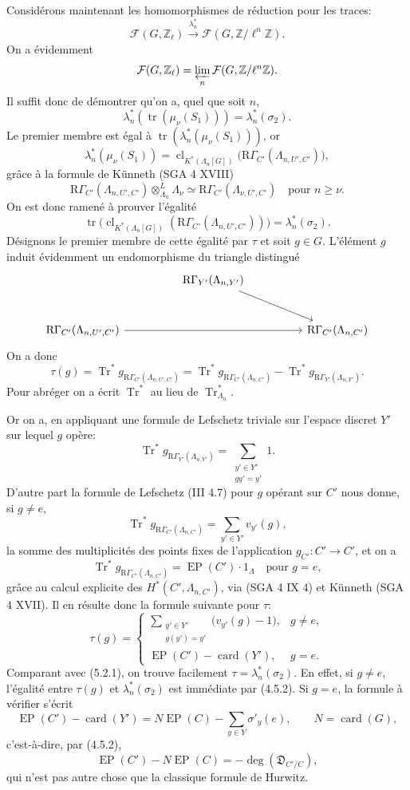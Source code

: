 \documentclass[11pt]{article}
\providecommand{\Tr}{\operatorname{Tr}}
\providecommand{\EP}{\operatorname{EP}}
\providecommand{\Tr}{\operatorname{Tr}}
\providecommand{\Tr}{\operatorname{Tr}}
\providecommand{\Tr}{\operatorname{Tr}}
\providecommand{\EP}{\operatorname{EP}}
\providecommand{\clKstar}[1]{\operatorname{cl}_{K^*(#1)}}
\providecommand{\RG}{\mathrm R\Gamma}
\begin{document}
Considérons maintenant les homomorphismes de réduction pour les traces:
\[
\mathcal F(G,\mathbb Z_\ell)\xrightarrow{\lambda_n^*}\mathcal F(G,\mathbb Z/\ell^n\mathbb Z).
\]
On a évidemment
\[
\mathcal F(G,\mathbb Z_\ell)=\varprojlim_n\mathcal F(G,\mathbb Z/\ell^n\mathbb Z).
\]
Il suffit donc de démontrer qu'on a, quel que soit $n$,
\[
\lambda_n^*(\operatorname{tr}(\mu_\nu(S_1)))=\lambda_n^*(\sigma_2).
\]
Le premier membre est égal à $\operatorname{tr}(\lambda_n^*(\mu_\nu(S_1)))$, or
\[
\lambda_n^*(\mu_\nu(S_1))
=
\clKstar{\Lambda_n[G]}\bigl(\RG_{C'}(\Lambda_{n,U',C'})\bigr),
\]
grâce à la formule de Künneth (SGA 4 XVIII)
\[
\RG_{C'}(\Lambda_{n,U',C'})\otimes_{\Lambda_n}^{L}\Lambda_\nu
\simeq \RG_{C'}(\Lambda_{\nu,U',C'})
\quad\text{pour } n\ge\nu.
\]
On est donc ramené à prouver l'égalité
\[
\operatorname{tr}\bigl(\clKstar{\Lambda_n[G]}(\RG_{C'}(\Lambda_{n,U',C'}))\bigr)
=
\lambda_n^*(\sigma_2).
\]
Désignons le premier membre de cette égalité par $\tau$ et soit $g\in G$. L'élément $g$ induit évidemment un endomorphisme du triangle distingué
\[
\begin{tikzcd}[column sep=huge,row sep=large]
& \RG_{Y'}(\Lambda_{n,Y'}) \arrow[dr] & \\
\RG_{C'}(\Lambda_{n,U',C'}) \arrow[rr] && \RG_{C'}(\Lambda_{n,C'})
\end{tikzcd}
\]
On a donc
\[
\tau(g)=\Tr^*g_{\RG_{C'}(\Lambda_{n,U',C'})}
=\Tr^*g_{\RG_{C'}(\Lambda_{n,C'})}
-\Tr^*g_{\RG_{Y'}(\Lambda_{n,Y'})}.
\]
Pour abréger on a écrit $\Tr^*$ au lieu de $\Tr^*_{\Lambda_n}$.

Or on a, en appliquant une formule de Lefschetz triviale sur l'espace discret $Y'$ sur lequel $g$ opère:
\[
\Tr^*g_{\RG_{Y'}(\Lambda_{n,Y'})}
=
\sum_{\substack{y'\in Y'\\gy'=y'}}1.
\]
D'autre part la formule de Lefschetz (III 4.7) pour $g$ opérant sur $C'$ nous donne, si $g\ne e$,
\[
\Tr^*g_{\RG_{C'}(\Lambda_{n,C'})}
=
\sum_{y'\in Y'} v_{y'}(g),
\]
la somme des multiplicités des points fixes de l'application $g_{C'}:C'\to C'$, et on a
\[
\Tr^*g_{\RG_{C'}(\Lambda_{n,C'})}=\EP(C')\cdot1_\Lambda
\quad\text{pour }g=e,
\]
grâce au calcul explicite des $H^*(C',\Lambda_{n,C'})$, via (SGA 4 IX 4) et Künneth (SGA 4 XVII). Il en résulte donc la formule suivante pour $\tau$:
\[
\tau(g)=
\begin{cases}
\displaystyle\sum_{\substack{y'\in Y'\\g(y')=y'}}\bigl(v_{y'}(g)-1\bigr),& g\ne e,\\[0.8em]
\EP(C')-\operatorname{card}(Y'),& g=e.
\end{cases}
\tag{5.2.2}
\]
Comparant avec (5.2.1), on trouve facilement $\tau=\lambda_n^*(\sigma_2)$. En effet, si $g\ne e$, l'égalité entre $\tau(g)$ et $\lambda_n^*(\sigma_2)$ est immédiate par (4.5.2). Si $g=e$, la formule à vérifier s'écrit
\[
\EP(C')-\operatorname{card}(Y')
=
N\EP(C)-\sum_{y\in Y}\sigma'_y(e),
\qquad N=\operatorname{card}(G),
\]
c'est-à-dire, par (4.5.2),
\[
\EP(C')-N\EP(C)=-\deg(\mathfrak D_{C'/C}),
\]
qui n'est pas autre chose que la classique formule de Hurwitz.
\end{document}
